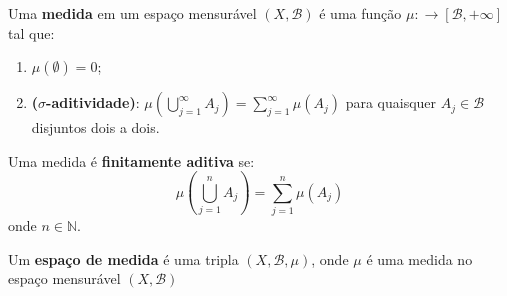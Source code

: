 

\begin{definicao}
    
    Uma \textbf{medida} em um espaço mensurável $(X,\mathcal{B})$ é uma função $\mu: \longrightarrow [\mathcal{B}, +\infty]$ tal que:
    
    \begin{enumerate}[label=(\roman*)]
        \item $\mu(\emptyset) = 0 $;
        \item \textbf{($\sigma$-aditividade)}: $\mu( \bigcup _ {j=1} ^{\infty} A_j) = \sum ^{\infty} _{j=1} \mu (A_j) $ para quaisquer $A_j \in \mathcal{B} $ disjuntos dois a dois.   
    \end{enumerate}

Uma medida é \textbf{finitamente aditiva} se: 
\[ \mu( \bigcup _ {j=1} ^{n} A_j) = \sum ^{n} _{j=1} \mu (A_j) 
\]
onde $n \in \mathbb{N}$.


\end{definicao}
    
\begin{definicao}
    Um \textbf{espaço de medida} é uma tripla $(X,\mathcal{B},\mu)$, onde $\mu$ é uma medida no espaço mensurável $(X,\mathcal{B})$
\end{definicao}


